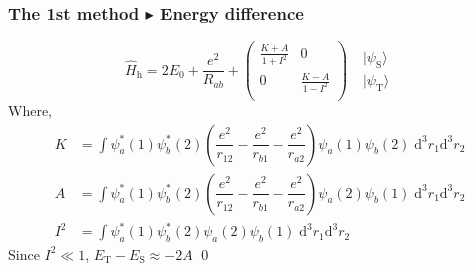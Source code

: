 \documentclass{beamer}
\begin{document}
  \begin{frame}
    \frametitle{The 1st method \(\blacktriangleright\) Energy difference}
    \begin{equation*}
      \widehat{H}_{\text{h}} = 2E_0 + \dfrac{e^2}{R_{ab}} + \begin{pmatrix}
        \frac{K+A}{1+I^2} & 0 \\
        0 & \frac{K-A}{1-I^2}\\
      \end{pmatrix} \ \ \ \begin{matrix}
        |\psi_{\text{S}}\rangle\\[0.5em]
        |\psi_{\text{T}}\rangle
      \end{matrix}
    \end{equation*}
    Where,
    \begin{subequations}
      \begin{align}
        K &= \int \psi_a^*(1)\psi_b^*(2)\left(\dfrac{e^2}{r_{12}} - \dfrac{e^2}{r_{b1}} - \dfrac{e^2}{r_{a2}}\right)\psi_a(1)\psi_b(2)\;\mathrm{d}^3r_1\mathrm{d}^3r_2\\
        A &= \int \psi_a^*(1)\psi_b^*(2)\left(\dfrac{e^2}{r_{12}} - \dfrac{e^2}{r_{b1}} - \dfrac{e^2}{r_{a2}}\right)\psi_a(2)\psi_b(1)\;\mathrm{d}^3r_1\mathrm{d}^3r_2\\
        I^2 &= \int \psi_a^*(1)\psi_b^*(2)\psi_a(2)\psi_b(1)\;\mathrm{d}^3r_1\mathrm{d}^3r_2
      \end{align}
    \end{subequations}
    Since \(I^2 \ll 1\), \(E_\text{T} - E_\text{S} \approx -2A\) \qed
  \end{frame}
\end{document}
